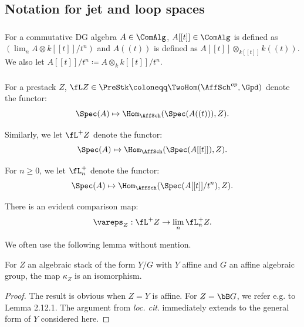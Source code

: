 \subsection{Notation for jet and loop spaces}\label{ss:jet-notation}

\subsubsection{}

For a commutative DG algebra $A \in \ComAlg$,
$A[[t]] \in \ComAlg$ is defined as
$(\lim_n A \otimes k[[t]]/t^n)$ and $A((t))$ is defined
as $A[[t]] \otimes_{k[[t]]} k((t))$. We also let
$A[[t]]/t^n \coloneqq A \otimes_k k[[t]]/t^n$.

\subsubsection{}

For a prestack $Z$,
$\fL Z \in \PreStk \coloneqq \TwoHom(\AffSch^{op},\Gpd)$ denote the functor:
%
\[
\Spec(A) \mapsto \Hom_{\AffSch}(\Spec(A((t))),Z).
\]

 Similarly, we let $\fL^+ Z$ denote the functor:
%
\[
\Spec(A) \mapsto \Hom_{\AffSch}(\Spec(A[[t]]),Z).
\]

For $n \geq 0$, we let $\fL_n^+$ denote the functor:
%
\[
\Spec(A) \mapsto \Hom_{\AffSch}(\Spec(A[[t]]/t^n),Z).
\]

There is an evident comparison map:
%
\[
\vareps_Z:\fL^+ Z \to \underset{n}{\lim} \, \fL_n^+ Z.
\]

We often use the following lemma without mention.

\begin{lem}
\notready

For $Z$ an algebraic stack of
the form $Y/G$ with $Y$ affine and $G$ an affine
algebraic group, the map $\kappa_Z$ is an isomorphism.

\end{lem}

\begin{proof}

The result is obvious when $Z = Y$ is affine.
For $Z = \bB G$, we refer e.g. to \cite{cpsii} Lemma 2.12.1.
The argument from \emph{loc. cit}. immediately
extends to the general form of $Y$ considered here.

\end{proof}

